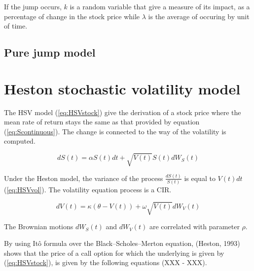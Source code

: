 \documentclass[12pt]{report}
\newcommand{\Bmsub}[1]{W_{#1}\left(t\right)}
\newcommand{\St}{S\left(t\right)}
\newcommand{\Vt}{V\left(t\right)}
\newcommand{\HSVstock}{d\St = \alpha \St dt + \sqrt{\Vt} \St d \Bmsub{S}}
\newcommand{\HSVvol}{d\Vt = \kappa\left(\theta - \Vt \right) + \omega \sqrt{\Vt} d \Bmsub{V}}
\begin{document}
If the jump occurs, $k$ is a random variable that give a measure of its impact, as a percentage of change in the stock price while $\lambda$ is the average of occuring by unit of time. 





\subsection{Pure jump model}
\label{sub:PureJump}





\section{Heston stochastic volatility model}
\label{sec:Heston}

The HSV model (\ref{eq:HSVstock}) give the derivation of a stock price where the mean rate of return stays the same as that provided by equation (\ref{eq:Scontinuous}).
The change is connected to the way of the volatility is computed.

\begin{center}
  \begin{equation}
    \HSVstock
    \label{eq:HSVstock}
  \end{equation}
\end{center}

Under the Heston model, the variance of the process $\frac{d\St}{\St}$ is equal to $\Vt dt$ (\ref{eq:HSVvol}). The volatility equation process is a CIR.

\begin{center}
  \begin{equation}
    \HSVvol
    \label{eq:HSVvol}
  \end{equation}
\end{center}

The Brownian motions $d\Bmsub{S}$ and $d\Bmsub{V}$ are correlated with parameter $\rho$.


By using Itô formula over the Black--Scholes--Merton equation, (Heston, 1993) shows that the price of a call option for which the underlying is given by (\ref{eq:HSVstock}), is given by the following equations (XXX - XXX).
\end{document}
